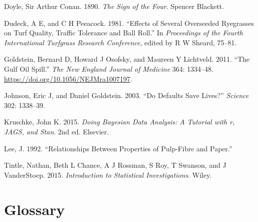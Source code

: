 \documentclass[
  letterpaper,
  DIV=11,
  numbers=noendperiod]{scrreprt}
\newlength{\cslhangindent}
\newlength{\cslentryspacingunit} %
\newenvironment{CSLReferences}[2] %
 {%
  \setlength{\parindent}{0pt}
  \ifodd #1
  \let\oldpar\par
  \def\par{\hangindent=\cslhangindent\oldpar}
  \fi
  \setlength{\parskip}{#2\cslentryspacingunit}
 }%
 {}
\theoremstyle{definition}
\theoremstyle{definition}
\theoremstyle{plain}
\theoremstyle{remark}
\begin{document}
\hypertarget{refs}{}
\begin{CSLReferences}{1}{0}
\leavevmode{}%
Doyle, Sir Arthur Conan. 1890. \emph{The Sign of the Four}. Spencer
Blackett.

\leavevmode{}%
Dudeck, A E, and C H Peeacock. 1981. {``Effects of Several Overseeded
Ryegrasses on Turf Quality, Traffic Tolerance and Ball Roll.''} In
\emph{Proceedings of the Fourth International Turfgrass Research
Conference}, edited by R W Sheard, 75--81.

\leavevmode{}%
Goldstein, Bernard D, Howard J Osofsky, and Maureen Y Lichtveld. 2011.
{``The Gulf Oil Spill.''} \emph{The New England Journal of Medicine}
364: 1334--48. \url{https://doi.org/10.1056/NEJMra1007197}.

\leavevmode{}%
Johnson, Eric J, and Daniel Goldstein. 2003. {``Do Defaults Save
Lives?''} \emph{Science} 302: 1338--39.

\leavevmode{}%
Kruschke, John K. 2015. \emph{Doing Bayesian Data Analysis: A Tutorial
with r, JAGS, and Stan}. 2nd ed. Elsevier.

\leavevmode{}%
Lee, J. 1992. {``Relationships Between Properties of Pulp-Fibre and
Paper.''}

\leavevmode{}%
Tintle, Nathan, Beth L Chance, A J Rossman, S Roy, T Swanson, and J
VanderStoep. 2015. \emph{Introduction to Statistical Investigations}.
Wiley.

\end{CSLReferences}

\cleardoublepage
{}
{}
\appendix

\hypertarget{glossary}{%
\chapter{Glossary}\label{glossary}}

\providecommand{\norm}[1]{\lVert#1\rVert}
\providecommand{\abs}[1]{\lvert#1\rvert}
\providecommand{\iid}{\stackrel{\text{IID}}{\sim}}
\providecommand{\ind}{\stackrel{\text{Ind}}{\sim}}

\providecommand{\bm}[1]{\mathbf{#1}}
\providecommand{\bs}[1]{\boldsymbol{#1}}
\providecommand{\bbeta}{\bs{\beta}}
\end{document}
